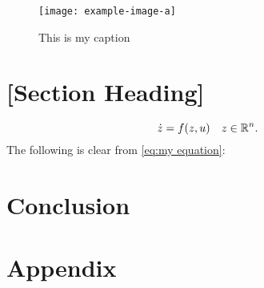 \begin{figure}[htbp]
    \centering
    \texttt{[image: example-image-a]}
    \caption{This is my caption}
    \label{fig:this is a figure}
\end{figure}

\lipsum[7]

\section{[Section Heading]}

\lipsum[9]
\begin{equation}
    \label{eq:my equation}
    \dot z = f(z,u) \quad z \in \mathbb{R}^n.
\end{equation}
The following is clear from \cref{eq:my equation}:
\lipsum[10-11]

\section{Conclusion}
\label{sec:conclusion}
\lipsum[12]


\nocite{knuth:ct:a}
\nocite{glashow}
\nocite{aristotle:physics}
\nocite{moore}
\nocite{salam}
\nocite{ctan}
\nocite{loh}
\printbibliography

\appendix
\section{Appendix}
\label{sec:appendix}

\lipsum[1]
